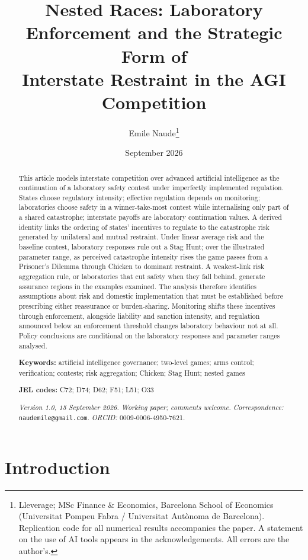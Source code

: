 \documentclass[11pt]{article}
\title{Nested Races: Laboratory Enforcement and the Strategic Form of\\ Interstate Restraint in the AGI Competition}
\author{Emile Naude\thanks{Lleverage; MSc Finance \& Economics, Barcelona School of Economics (Universitat Pompeu Fabra / Universitat Autònoma de Barcelona). Replication code for all numerical results accompanies the paper. A statement on the use of AI tools appears in the acknowledgements. All errors are the author's.}}
\date{September 2026}
\theoremstyle{plain}
\theoremstyle{definition}
\theoremstyle{remark}
\begin{document}
\maketitle

\begin{abstract}
\noindent This article models interstate competition over advanced artificial intelligence as the continuation of a laboratory safety contest under imperfectly implemented regulation. States choose regulatory intensity; effective regulation depends on monitoring; laboratories choose safety in a winner-take-most contest while internalising only part of a shared catastrophe; interstate payoffs are laboratory continuation values. A derived identity links the ordering of states' incentives to regulate to the catastrophe risk generated by unilateral and mutual restraint. Under linear average risk and the baseline contest, laboratory responses rule out a Stag Hunt; over the illustrated parameter range, as perceived catastrophe intensity rises the game passes from a Prisoner's Dilemma through Chicken to dominant restraint. A weakest-link risk aggregation rule, or laboratories that cut safety when they fall behind, generate assurance regions in the examples examined. The analysis therefore identifies assumptions about risk and domestic implementation that must be established before prescribing either reassurance or burden-sharing. Monitoring shifts these incentives through enforcement, alongside liability and sanction intensity, and regulation announced below an enforcement threshold changes laboratory behaviour not at all. Policy conclusions are conditional on the laboratory responses and parameter ranges analysed.

\medskip\noindent\textbf{Keywords:} artificial intelligence governance; two-level games; arms control; verification; contests; risk aggregation; Chicken; Stag Hunt; nested games

\noindent\textbf{JEL codes:} C72; D74; D62; F51; L51; O33

\noindent\textit{Version 1.0, 15 September 2026. Working paper; comments welcome.} \textit{Correspondence:} \texttt{naudemile@gmail.com}. \textit{ORCID:} 0009-0006-4950-7621.
\end{abstract}

\section{Introduction}
\end{document}
